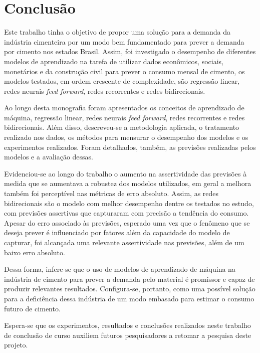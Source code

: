 
\chapter{Conclusão}
\label{chap:conclusao}

Este trabalho tinha o objetivo de propor uma solução para a demanda da indústria cimenteira 
por um modo bem fundamentado para prever a demanda por cimento nos estados Brasil.
Assim, foi investigado o desempenho de diferentes modelos de aprendizado na 
tarefa de utilizar dados econômicos, sociais, monetários e da construção civil 
para prever o consumo mensal de cimento, os modelos testados, em ordem 
crescente de complexidade, são regressão linear, redes neurais \textit{feed 
forward}, redes recorrentes e redes bidirecionais. 

Ao longo desta monografia foram apresentados os conceitos de aprendizado 
de máquina, regressão linear, redes neurais \textit{feed forward}, redes 
recorrentes e redes bidirecionais. Além disso, descreveu-se a metodologia aplicada, 
o tratamento realizado nos dados, os métodos para mensurar o desempenho dos 
modelos e os experimentos realizados. Foram detalhados, também, as previsões
realizadas pelos modelos e a avaliação dessas.

Evidenciou-se ao longo do trabalho o aumento na assertividade das previsões 
à medida que se aumentava a robustez dos modelos utilizados, em geral a melhora
também foi perceptível nas métricas de erro absoluto. Assim, as redes bidirecionais
são o modelo com melhor desempenho dentre os testados no estudo, com previsões
assertivas que capturaram com precisão a tendência do consumo. Apesar do erro 
associado às previsões, esperado uma vez que o fenômeno que se deseja prever 
é influenciado por fatores além da capacidade do modelo de capturar, foi 
alcançada uma relevante assertividade nas previsões, além de um baixo erro 
absoluto.

Dessa forma, infere-se que o uso de modelos de aprendizado de máquina na indústria 
de cimento para prever a demanda pelo material é promissor e capaz de produzir 
relevantes resultados. Configura-se, portanto, como uma possível solução para 
a deficiência dessa indústria de um modo embasado para estimar o consumo futuro de 
cimento. 

Espera-se que os experimentos, resultados e conclusões realizados 
neste trabalho de conclusão de curso auxiliem futuros pesquisadores a retomar a 
pesquisa deste projeto.
